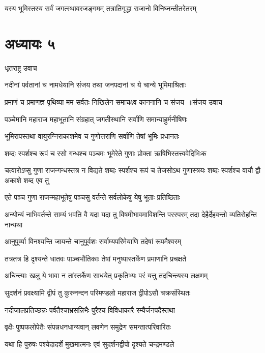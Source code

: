 \twolineshloka
{यस्य भूमिस्तस्य सर्वं जगत्स्थावरजङ्गमम्}
{तत्रातिगृद्धा राजानो विनिघ्नन्तीतरेतरम्}


\chapter{अध्यायः ५}
\twolineshloka
{धृतराष्ट्र उवाच}
{}


\twolineshloka
{नदीनां पर्वतानां च नामधेयानि संजय}
{तथा जनपदानां च ये चान्ये भूमिमाश्रिताः}


\threelineshloka
{प्रमाणं च प्रमाणज्ञ पृथिव्या मम सर्वतः}
{निखिलेन समाचक्ष्व काननानि च संजय ॥संजय उवाच}
{}


\twolineshloka
{पञ्चेमानि महाराज महाभूतानि संग्रहात्}
{जगतीस्थानि सर्वाणि समान्याहुर्मनीषिणः}


\twolineshloka
{भूमिरापस्तथा वायुरग्निराकाशमेव च}
{गुणोत्तराणि सर्वाणि तेषां भूमिः प्रधानतः}


\twolineshloka
{शब्दः स्पर्शश्च रूपं च रसो गन्धश्च पञ्चमः}
{भूमेरेते गुणाः प्रोक्ता ऋषिभिस्तत्त्ववेदिभिःक}


\threelineshloka
{चत्वारोऽप्सु गुणा राजन्गन्धस्तत्र न विद्यते}
{शब्दः स्पर्शश्च रूपं च तेजसोऽथ गुणास्त्रयः}
{शब्दः स्पर्शश्च वायौ द्वौ अकाशे शब्द एव तु}


\twolineshloka
{एते पञ्च गुणा राजन्महाभूतेषु पञ्चसु}
{वर्तन्ते सर्वलोकेषु येषु भूताः प्रतिष्ठिताः}


अन्योन्यं नाभिवर्तन्ते साम्यं भवति वै यदा
\twolineshloka
{यदा तु विषमीभावमाविशन्ति परस्परम्}
{तदा देहैर्देहवन्तो व्यतिरोहन्ति नान्यथा}


\twolineshloka
{आनुपूर्व्या विनश्यन्ति जायन्ते चानुपूर्वशः}
{सर्वाम्यपरिमेयाणि तदेषां रूपमैश्वरम्}


\twolineshloka
{तत्रतत्र हि दृश्यन्ते धातवः पाञ्चभौतिकाः}
{तेषां मनुष्यास्तर्केण प्रमाणानि प्रचक्षते}


\twolineshloka
{अचिन्त्याः खलु ये भावा न तांस्तर्केण साधयेत्}
{प्रकृतिभ्यः परं यत्तु तदचिन्त्यस्य लक्षणम्}


\twolineshloka
{सुदर्शनं प्रवक्ष्यामि द्वीपं तु कुरुनन्दन}
{परिमण्डलो महाराज द्वीपोऽसौ चक्रसंस्थितः}


\twolineshloka
{नदीजालप्रतिच्छन्नः पर्वतैश्चाभ्रसन्निभैः}
{पुरैश्च विविधाकारै रम्यैर्जनपदैस्तथा}


\twolineshloka
{वृक्षैः पुष्पफलोपेतैः संपन्नधनधान्यवान्}
{लवणेन समुद्रेण समन्तात्परिवारितः}


\twolineshloka
{यथा हि पुरुषः पश्येदादर्शे मुखमात्मनः}
{एवं सुदर्शनद्वीपो दृश्यते चन्द्रमण्डले}


